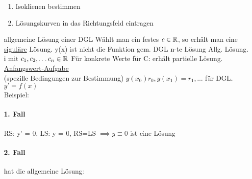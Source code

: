 \documentclass{../tudscript}
\begin{document}
        \begin{enumerate}
            \item Isoklienen bestimmen
            \item Lösungskurven in das Richtungsfeld eintragen
        \end{enumerate}
        allgemeine Lösung einer DGL
        Wählt man ein festes $c \in \mathbb{R}$, so erhält man eine \underline{siguläre}
        Lösung.
        y(x) ist nicht die Funktion
            gem. DGL n-te Lösung 
            Allg. Lösung.
             i
            mit $c_1, c_2, \ldots c_n \in \mathbb{R}$
            Für konkrete Werte für C: erhält partielle Lösung.
            \\
            \underline{Anfangswert-Aufgabe}
            \\
            (spezille Bedingungen zur Bestimmung)
            $y(x_0) r_0, y(x_1) = r_1, \ldots$
            für DGL. $y' = f(x)$
            \\
            Beispiel:
            \\
            \paragraph{1. Fall} 
            RS: y' = 0, LS: y = 0, RS=LS 
            $\implies y \equiv 0$ ist eine Lösung
            \paragraph{2. Fall} 
    
            hat die allgemeine Lösung:
\end{document}

